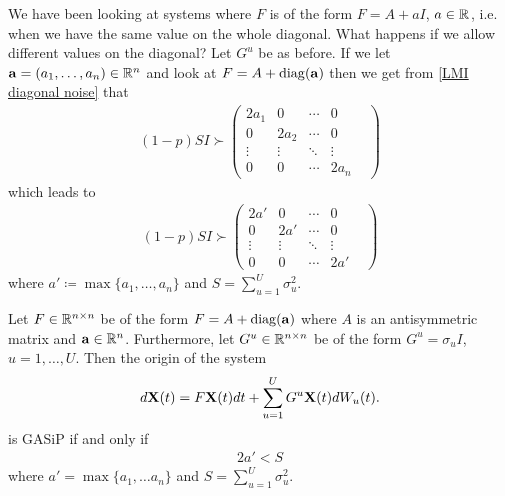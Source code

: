 \documentclass[a4paper,12pt,twoside,BCOR=10mm]{scrbook}
\begin{document}
We have been looking at systems where $F$ is of the form $F = A + aI$, $a \in \mathbb{R}^{}$, i.e. when we have the same value on the whole diagonal. What happens if we allow different values on the diagonal? Let $G^u$ be as before. If we let $\mathbf{a} = (a_1, \ldots, a_n)\in \mathbb{R}^{n}$ and look at $F = A + \operatorname{diag}(\mathbf{a})$ then we get from \eqref{LMI diagonal noise} that
\begin{align*}
    (1 - p)SI \succ \begin{pmatrix}
    2a_1 & 0 & \cdots & 0\\
    0 & 2a_2 & \cdots & 0\\
    \vdots & \vdots & \ddots & \vdots\\
    0 & 0 & \cdots & 2a_n&
    \end{pmatrix}
\end{align*}
which leads to
\begin{align*}
    (1 - p)SI \succ \begin{pmatrix}
    2a' & 0 & \cdots & 0\\
    0 & 2a' & \cdots & 0\\
    \vdots & \vdots & \ddots & \vdots\\
    0 & 0 & \cdots & 2a'&
    \end{pmatrix}
\end{align*}
where $a' \coloneqq \max\{a_1, \ldots, a_n\}$ and $S = \sum\limits_{u = 1}^U \sigma_u^2$.
\fi
\begin{theorem}\label{ThmSpecialCaseAlmennast}
Let $F \in \mathbb{R}^{n\times n}$ be of the form $F = A + \operatorname{diag}(\mathbf{a})$ where $A$ is an antisymmetric matrix and $\mathbf{a}\in\mathbb{R}^{n}$. Furthermore, let $G^u \in \mathbb{R}^{n \times n}$ be of the form $G^u = \sigma_u I$, $u = 1,\ldots, U$. Then the origin of the system
\begin{align*}
    d\mathbf{X}(t) = F\mathbf{X}(t)dt + \sum_{u=1}^U G^u\mathbf{X}(t)dW_u(t).
\end{align*}
is GASiP if and only if
\begin{align*}
    2a' < S
\end{align*}
where $a' = \max\{a_1, \ldots a_n\}$ and $S = \sum\limits_{u = 1}^U \sigma_u^2$.
\end{theorem}
\end{document}
